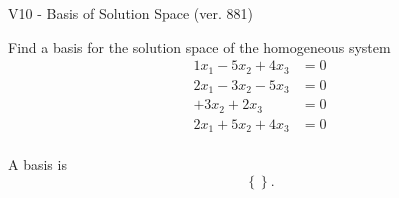 \begin{exercise}
  \begin{exerciseTitle}V10 - Basis of Solution Space (ver. 881)\end{exerciseTitle}
  \begin{exerciseStatement}
    Find a basis for the solution space of the homogeneous system 
\begin{align*}
 1 x_ 1 -5 x_ 2 + 4 x_ 3 &= 0  \\ 
  2 x_ 1 -3 x_ 2 -5 x_ 3 &= 0  \\ 
  + 3 x_ 2 + 2 x_ 3 &= 0  \\ 
  2 x_ 1 + 5 x_ 2 + 4 x_ 3 &= 0  \\ 
 \end{align*}


 
  \end{exerciseStatement}

  \begin{exerciseAnswer}
   A basis is   
\[\left\{\right\}.\]

  


  \end{exerciseAnswer}
\end{exercise}